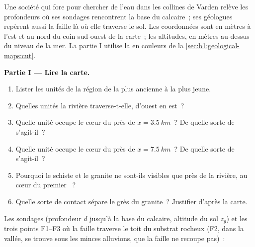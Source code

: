 \begin{problem}
\label{pb:b1:geological-maps:1}
Une société qui fore pour chercher de l'eau dans les collines de Varden relève
les profondeurs où ses sondages rencontrent la base du calcaire~; ses géologues
repèrent aussi la faille là où elle traverse le sol. Les coordonnées sont en
mètres à l'est et au nord du coin sud-ouest de la carte~; les altitudes, en
mètres au-dessus du niveau de la mer. La partie I utilise la  en
couleurs de la \cref{sec:b1:geological-maps:cut}.

\medskip
\noindent\textbf{Partie I --- Lire la carte.}
\begin{enumerate}
  \item Lister les unités de la région de la plus ancienne à la plus jeune.
  \item Quelles unités la rivière traverse-t-elle, d'ouest en est~?
  \item Quelle unité occupe le cœur du  près de $x = \qty{3.5}{km}$~? De
        quelle sorte de  s'agit-il~?
  \item Quelle unité occupe le cœur du  près de $x = \qty{7.5}{km}$~? De
        quelle sorte de  s'agit-il~?
  \item Pourquoi le schiste et le granite ne sont-ils visibles que près de la
        rivière, au cœur du premier ~?
  \item Quelle sorte de contact sépare le grès du granite~? Justifier d'après la
        carte.
\end{enumerate}

\medskip
\noindent Les sondages (profondeur $d$ jusqu'à la base du calcaire, altitude du
sol $z_g$) et les trois points F1--F3 où la faille traverse le toit du substrat
rocheux (F2, dans la vallée, se trouve sous les minces alluvions, que la faille
ne recoupe pas)~:


\end{problem}
